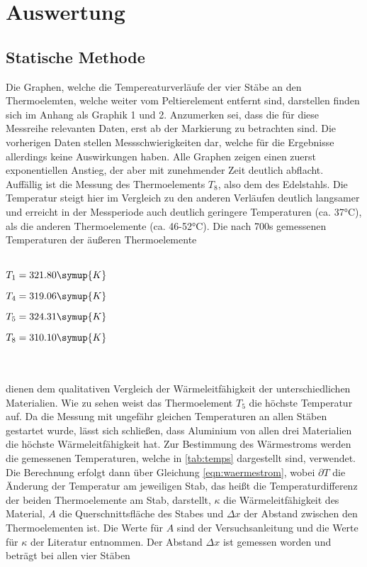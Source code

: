\section{Auswertung}
\label{sec:Auswertung}
\subsection{Statische Methode}
Die Graphen, welche die Tempereaturverläufe der vier Stäbe an den Thermoelemten, welche weiter vom Peltierelement entfernt sind, darstellen finden
sich im Anhang als Graphik 1 und 2. Anzumerken sei, dass die für diese Messreihe relevanten Daten, erst ab der Markierung zu betrachten sind. Die vorherigen
Daten stellen Messschwierigkeiten dar, welche für die Ergebnisse allerdings keine Auswirkungen haben. Alle Graphen zeigen einen zuerst exponentiellen 
Anstieg, der aber mit zunehmender Zeit deutlich abflacht. Auffällig ist die Messung des Thermoelements $T_8$, also dem des Edelstahls. Die Temperatur 
steigt hier im Vergleich zu den anderen Verläufen deutlich langsamer und erreicht in der Messperiode auch deutlich geringere Temperaturen (ca. 37°C), als die 
anderen Thermoelemente (ca. 46-52°C). Die nach 700s gemessenen Temperaturen der äußeren Thermoelemente
\\ \\
\centerline{$T_1 = 321.80 \symup{K}$}
\centerline{$T_4 =  319.06 \symup{K}$}
\centerline{$T_5 =  324.31 \symup{K}$}
\centerline{$T_8 =  310.10 \symup{K}$}
\\ \\
dienen dem qualitativen Vergleich der Wärmeleitfähigkeit der unterschiedlichen Materialien.
Wie zu sehen weist das Thermoelement $T_5$ die höchste Temperatur auf. Da die Messung mit ungefähr gleichen Temperaturen an allen Stäben gestartet wurde,
lässt sich schließen, dass Aluminium von allen drei Materialien die höchste Wärmeleitfähigkeit hat. 
Zur Bestimmung des Wärmestroms werden die gemessenen Temperaturen, welche in \autoref{tab:temps} dargestellt sind, verwendet. 
Die Berechnung erfolgt dann über Gleichung \eqref{eqn:waermestrom}, wobei $\partial T$ die Änderung der Temperatur am jeweiligen Stab, das heißt 
die Temperaturdifferenz der beiden Thermoelemente am Stab, darstellt, $\kappa$ die Wärmeleitfähigkeit des Material, $A$ die Querschnittsfläche des Stabes und $\Delta x$ der Abstand zwischen den Thermoelementen ist.
Die Werte für $A$ sind der Versuchsanleitung \cite[2]{v204} und die Werte für $\kappa$ der Literatur \cite{internet} entnommen. Der Abstand $\Delta x$ ist gemessen worden und beträgt bei allen vier Stäben
